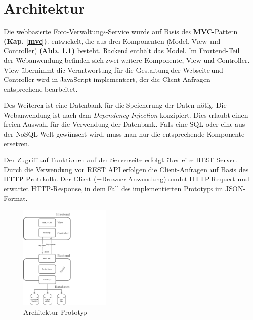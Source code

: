 \chapter{Architektur}

Die webbasierte Foto-Verwaltungs-Service wurde auf Basis des \textbf{MVC-}Pattern \textbf{(Kap. \ref{mvc})}. entwickelt, die aus drei Komponenten (Model, View und Controller) \textbf{(Abb. \ref{img:architectureMyApp})} besteht. Backend enthält das Model. Im Frontend-Teil der Webanwendung befinden sich zwei weitere Komponente, View und Controller. View übernimmt die Verantwortung für die Gestaltung der Webseite und Controller wird in JavaScript implementiert, der die Client-Anfragen entsprechend bearbeitet.

Des Weiteren ist eine Datenbank für die Speicherung der Daten nötig. Die Webanwendung ist nach dem \textit{Dependency Injection} konzipiert. Dies erlaubt einen freien Auswahl für die Verwendung der Datenbank. Falls eine SQL oder eine aus der NoSQL-Welt gewünscht wird, muss man nur die entsprechende Komponente ersetzen.

Der Zugriff auf Funktionen auf der Serverseite erfolgt über eine REST Server. Durch die Verwendung von REST API erfolgen die Client-Anfragen auf Basis des HTTP-Protokolls. Der Client (=Browser Anwendung) sendet HTTP-Request und erwartet HTTP-Response, in dem Fall des implementierten Prototyps im JSON-Format.

\begin{figure}[H]
\centering
\includegraphics[trim = 0mm 0mm 0mm 0mm, clip, width=0.4\textwidth]{resources/architectureMyAppWithoutFrameworks}
\caption[Architektur-Prototyp]{Architektur-Prototyp}
\label{img:architectureMyApp}
\end{figure}

